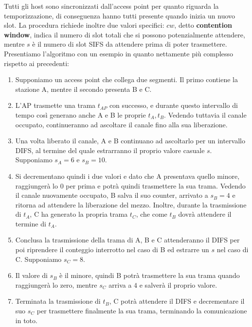 \noindent Tutti gli host sono sincronizzati dall'access point per quanto riguarda la temporizzazione, di conseguenza hanno tutti presente quando inizia
un nuovo slot. La procedura richiede inoltre due valori specifici: $cw$, detto \textbf{contention window}, indica il numero di slot totali che si
possono potenzialmente attendere, mentre $s$ è il numero di slot SIFS da attendere prima di poter trasmettere. Presentiamo l'algoritmo con un esempio
in quanto nettamente più complesso rispetto ai precedenti: \begin{enumerate}
    \item Supponiamo un access point che collega due segmenti. Il primo contiene la stazione A, mentre il secondo presenta B e C.
    \item L'AP trasmette una trama $t_{AP}$ con successo, e durante questo intervallo di tempo così generano anche A e B le proprie $t_A, t_B$. Vedendo
    tuttavia il canale occupato, continueranno ad ascoltare il canale fino alla sua liberazione.
    \item Una volta liberato il canale, A e B continuano ad ascoltarlo per un intervallo DIFS, al termine del quale estrarranno il proprio valore
    casuale $s$. Supponiamo $s_A=6$ e $s_B=10$.
    \item Si decrementano quindi i due valori e dato che A presentava quello minore, raggiungerà lo 0 per prima e potrà quindi trasmettere la sua trama.
    Vedendo il canale nuovamente occupato, B salva il suo counter, arrivato a $s_B=4$ e ritorna ad attendere la liberazione del mezzo. Inoltre, durante
    la trasmissione di $t_A$, C ha generato la propria trama $t_C$, che come $t_B$ dovrà attendere il termine di $t_A$.
    \item Conclusa la trasmissione della trama di A, B e C attenderanno il DIFS per poi riprendere il conteggio interrotto nel caso di B ed estrarre un
    $s$ nel caso di C. Supponiamo $s_C=8$.
    \item Il valore di $s_B$ è il minore, quindi B potrà trasmettere la sua trama quando raggiungerà lo zero, mentre $s_C$ arriva a $4$ e salverà il
    proprio valore.
    \item Terminata la trasmissione di $t_B$, C potrà attendere il DIFS e decrementare il suo $s_C$ per trasmettere finalmente la sua trama, terminando
    la comunicazione in toto.
\end{enumerate}

